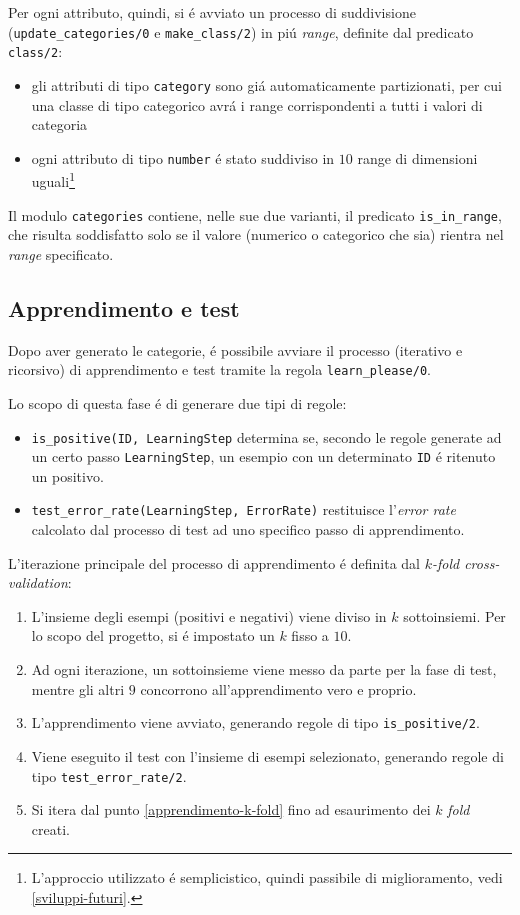 \documentclass[preprint]{acm_proc_article-sp}
\begin{document}
Per ogni attributo, quindi, si \'e avviato un processo di suddivisione (\verb|update_categories/0| e \verb|make_class/2|) in pi\'u \textit{range}, definite dal predicato \verb|class/2|:
\begin{itemize}
\item gli attributi di tipo \verb|category| sono gi\'a automaticamente partizionati, per cui una classe di tipo categorico avr\'a i range corrispondenti a tutti i valori di categoria
\item ogni attributo di tipo \verb|number| \'e stato suddiviso in $10$ range di dimensioni uguali\footnote{L'approccio utilizzato \'e semplicistico, quindi passibile di miglioramento, vedi \ref{sviluppi-futuri}.}
\end{itemize}

Il modulo \verb|categories| contiene, nelle sue due varianti, il predicato \verb|is_in_range|, che risulta soddisfatto solo se il valore (numerico o categorico che sia) rientra nel \textit{range} specificato.

\subsection{Apprendimento e test}
\label{prolog-learner}
Dopo aver generato le categorie, \'e possibile avviare il processo (iterativo e ricorsivo) di apprendimento e test tramite la regola \verb|learn_please/0|.

Lo scopo di questa fase \'e di generare due tipi di regole:
\begin{itemize}
\item \verb|is_positive(ID, LearningStep| determina se, secondo le regole generate ad un certo passo \verb|LearningStep|, un esempio con un determinato \verb|ID| \'e ritenuto un positivo.
\item \verb|test_error_rate(LearningStep, ErrorRate)| restituisce l'\textit{error rate} calcolato dal processo di test ad uno specifico passo di apprendimento.
\end{itemize}

L'iterazione principale del processo di apprendimento \'e definita dal $k$\textit{-fold cross-validation}:
\begin{enumerate}
\item L'insieme degli esempi (positivi e negativi) viene diviso in $k$ sottoinsiemi. Per lo scopo del progetto, si \'e impostato un $k$ fisso a $10$.
\item\label{apprendimento-k-fold} Ad ogni iterazione, un sottoinsieme viene messo da parte per la fase di test, mentre gli altri $9$ concorrono all'apprendimento vero e proprio.
\item L'apprendimento viene avviato, generando regole di tipo \verb|is_positive/2|.
\item Viene eseguito il test con l'insieme di esempi selezionato, generando regole di tipo \verb|test_error_rate/2|.
\item Si itera dal punto \ref{apprendimento-k-fold} fino ad esaurimento dei $k$ \textit{fold} creati.
\end{enumerate}
\end{document}
